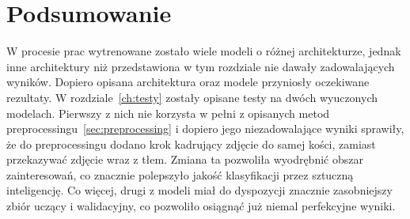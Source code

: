 \section{Podsumowanie}\label{sec:podsumowanie}

W procesie prac wytrenowane zostało wiele modeli o różnej architekturze, jednak inne architektury niż przedstawiona w tym rozdziale nie dawały zadowalających wyników.
Dopiero opisana architektura oraz modele przyniosły oczekiwane rezultaty.
W rozdziale~\ref{ch:testy} zostały opisane testy na dwóch wyuczonych modelach.
Pierwszy z nich nie korzysta w pełni z opisanych metod preprocessingu~\ref{sec:preprocessing} i dopiero jego niezadowalające wyniki sprawiły,
że do preprocessingu dodano krok kadrujący zdjęcie do samej kości, zamiast przekazywać zdjęcie wraz z tłem.
Zmiana ta pozwoliła wyodrębnić obszar zainteresowań, co znacznie polepszyło jakość klasyfikacji przez sztuczną inteligencję.
Co więcej, drugi z modeli miał do dyspozycji znacznie zasobniejszy zbiór uczący i walidacyjny, co pozwoliło osiągnąć już niemal perfekcyjne wyniki.

